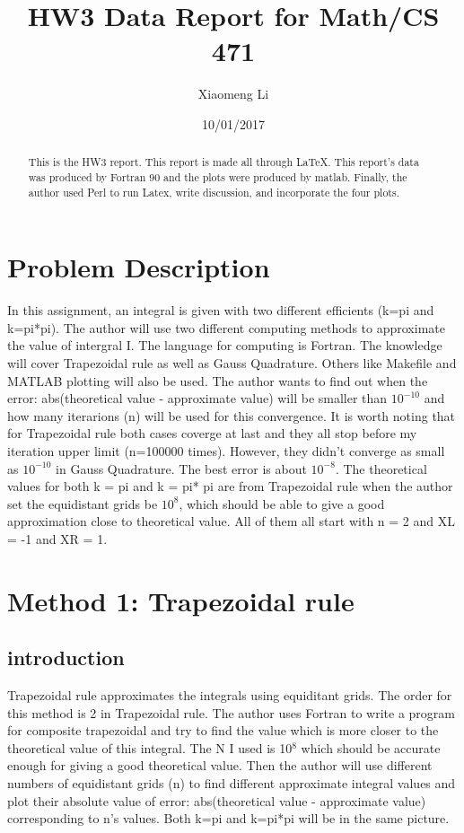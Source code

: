 \documentclass[titlepage]{article}
\title{HW3 Data Report for Math/CS 471}
\author{Xiaomeng Li}
\date{10/01/2017}   %
\begin{document}
\maketitle

\begin{abstract}
This is the HW3 report. This report is made all through LaTeX. This
report's data was produced by Fortran 90 and the plots were produced
by matlab. Finally, the author used Perl to run Latex, write
discussion, and incorporate the four plots.
\end{abstract}

\section{Problem Description}
In this assignment, an integral is given with two different efficients
(k=pi and k=pi*pi). The author will use two different computing methods
to approximate the value of intergral I. The language for computing is
Fortran. The knowledge will cover Trapezoidal rule as well as Gauss
Quadrature. Others like Makefile and MATLAB plotting will also be
used. The author wants to find out when the error: abs(theoretical value -
approximate value) will be smaller than $10^{-10}$ and how many
iterarions (n) will be used for this convergence. It is worth noting
that for Trapezoidal rule both cases coverge at last and they all stop
before my iteration upper limit (n=100000 times). However, they didn't converge
as small as  $10^{-10}$ in Gauss Quadrature. The best error is about
$10^{-8}$. The theoretical values for both k = pi and k = pi* pi are
from Trapezoidal rule when the author set the equidistant grids be
$10^{8}$, which should be able to give a good approximation close to
theoretical value. All of them all start with n = 2 and XL = -1 and XR = 1.

\section{Method 1: Trapezoidal rule}
\subsection{introduction}
Trapezoidal rule approximates the integrals using equiditant
grids. The order for this method is 2 in Trapezoidal rule. The author
uses Fortran to write a program for composite trapezoidal and try to
find the value which is more closer to the theoretical value of this
integral. The N I used is 10$^8$ which should be accurate enough for
giving a good theoretical value. Then the author will use different numbers of
equidistant grids (n) to find different approximate integral values
and plot their absolute value of error: abs(theoretical value -
approximate value) corresponding to n's values. Both k=pi and k=pi*pi
will be in the same picture.
\end{document}
